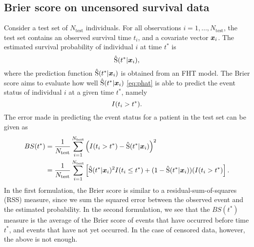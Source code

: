 \subsection{Brier score on uncensored survival data}
Consider a test set of $N_{\text{test}}$ individuals.
For all observations $i=1,\ldots,N_{\text{test}}$, the test set contains an observed survival time $t_i$, and a covariate vector $\bm{x}_i$.
The estimated survival probability of individual $i$ at time $t^*$ is
\begin{equation}\label{eq:phat}
    \hat{\operatorname{S}}(t^*|\bm{x}_i),
\end{equation}
where the prediction function $\hat{\operatorname{S}}(t^*|\bm{x}_i)$ is obtained from an FHT model.
The Brier score aims to evaluate how well $\hat{\operatorname{S}}(t^*|\bm{x}_i)$ \eqref{eq:phat} is able to predict the event status of individual $i$ at a given time $t^*$, namely
\begin{equation}
    I(t_i>t^*).
\end{equation}
The error made in predicting the event status for a patient in the test set can be given as
\begin{align*}
BS(t^*)&=\frac{1}{N_{\text{test}}}\sum_{i=1}^{N_{\text{test}}}\left(I(t_i>t^*)-\hat{\operatorname{S}}(t^*|\bm{x}_i)\right)^2 \\
    &=\frac{1}{N_{\text{test}}}\sum_{i=1}^{N_{\text{test}}}\left[\hat{\operatorname{S}}(t^*|\bm{x}_i)^2I(t_i\leq t^*)+(1-\hat{\operatorname{S}}(t^*|\bm{x}_i))(I(t_i>t^*)\right].
\end{align*}
In the first formulation, the Brier score is similar to a residual-sum-of-squares (RSS) measure, since we sum the squared error between the observed event and the estimated probability.
In the second formulation, we see that the $BS(t^*)$ measure is the average of the Brier score of events that have occurred before time $t^*$, and events that have not yet occurred.
In the case of censored data, however, the above is not enough.

